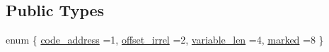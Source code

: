 \subsection*{Public Types}
\begin{DoxyCompactItemize}
\item 
enum \{ \mbox{\hyperlink{class_operand_symbol_a632b0e8d56cbf7fa6dfc31f03371b95bac9c1d99873ff0223ecc667922724745c}{code\+\_\+address}} =1, 
\mbox{\hyperlink{class_operand_symbol_a632b0e8d56cbf7fa6dfc31f03371b95bae126d8a9d48bb407197e83f6257fbd0e}{offset\+\_\+irrel}} =2, 
\mbox{\hyperlink{class_operand_symbol_a632b0e8d56cbf7fa6dfc31f03371b95ba319aeeb1a72beebba7bd615a197fbc6c}{variable\+\_\+len}} =4, 
\mbox{\hyperlink{class_operand_symbol_a632b0e8d56cbf7fa6dfc31f03371b95bac3f86a35cf54ec2f50154e941ce1238f}{marked}} =8
 \}
\end{DoxyCompactItemize}
